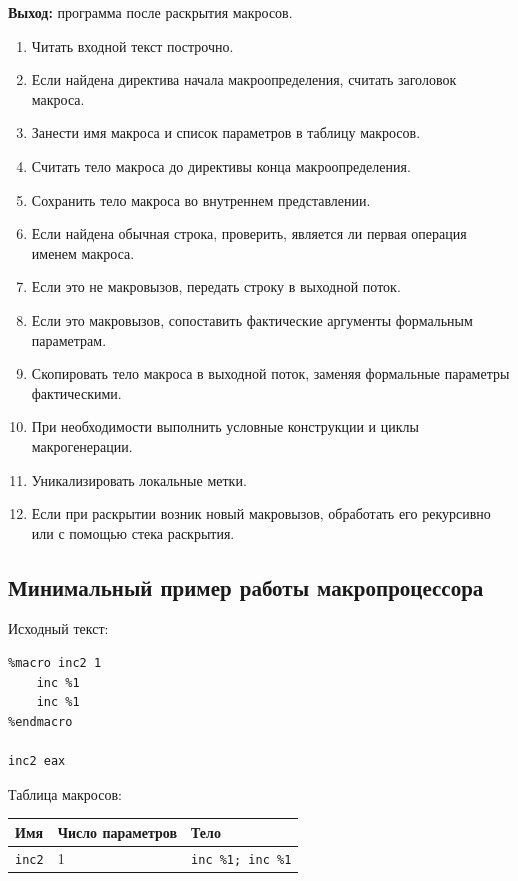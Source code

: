 \documentclass[12pt,a4paper]{article}
\begin{document}
\textbf{Выход:} программа после раскрытия макросов.

\begin{enumerate}
    \item Читать входной текст построчно.
    \item Если найдена директива начала макроопределения, считать заголовок макроса.
    \item Занести имя макроса и список параметров в таблицу макросов.
    \item Считать тело макроса до директивы конца макроопределения.
    \item Сохранить тело макроса во внутреннем представлении.
    \item Если найдена обычная строка, проверить, является ли первая операция именем макроса.
    \item Если это не макровызов, передать строку в выходной поток.
    \item Если это макровызов, сопоставить фактические аргументы формальным параметрам.
    \item Скопировать тело макроса в выходной поток, заменяя формальные параметры фактическими.
    \item При необходимости выполнить условные конструкции и циклы макрогенерации.
    \item Уникализировать локальные метки.
    \item Если при раскрытии возник новый макровызов, обработать его рекурсивно или с помощью стека раскрытия.
\end{enumerate}

\subsection{Минимальный пример работы макропроцессора}

Исходный текст:

\begin{lstlisting}
%macro inc2 1
    inc %1
    inc %1
%endmacro

inc2 eax
\end{lstlisting}

Таблица макросов:

\begin{center}
\begin{tabular}{lll}
\toprule
Имя & Число параметров & Тело \\
\midrule
\texttt{inc2} & 1 & \texttt{inc \%1; inc \%1} \\
\bottomrule
\end{tabular}
\end{center}
\end{document}
